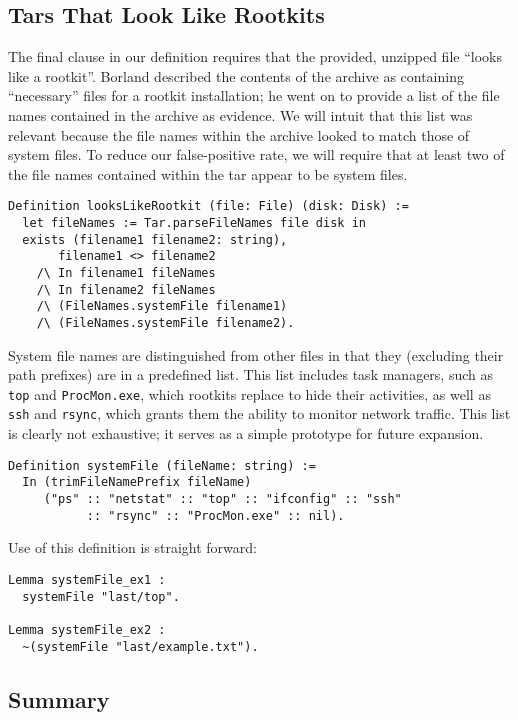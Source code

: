 \documentclass[nocopyrightspace,preprint]{sigplanconf}
\begin{document}
\subsection{Tars That Look Like Rootkits}

The final clause in our definition requires that the provided, unzipped file
``looks like a rootkit''. Borland described the contents of the archive as
containing ``necessary'' files for a rootkit installation; he went on to
provide a list of the file names contained in the archive as evidence. We will
intuit that this list was relevant because the file names within the archive
looked to match those of system files. To reduce our false-positive rate, we
will require that at least two of the file names contained within the tar
appear to be system files.

\begin{lstlisting}
Definition looksLikeRootkit (file: File) (disk: Disk) :=
  let fileNames := Tar.parseFileNames file disk in
  exists (filename1 filename2: string),
       filename1 <> filename2
    /\ In filename1 fileNames
    /\ In filename2 fileNames
    /\ (FileNames.systemFile filename1)
    /\ (FileNames.systemFile filename2).
\end{lstlisting}

System file names are distinguished from other files in that they (excluding
their path prefixes) are in a predefined list. This list includes task
managers, such as {\tt top} and {\tt ProcMon.exe}, which rootkits replace to
hide their activities, as well as {\tt ssh} and {\tt rsync}, which grants them
the ability to monitor network traffic. This list is clearly not exhaustive;
it serves as a simple prototype for future expansion.

\begin{lstlisting}
Definition systemFile (fileName: string) :=
  In (trimFileNamePrefix fileName)
     ("ps" :: "netstat" :: "top" :: "ifconfig" :: "ssh"
           :: "rsync" :: "ProcMon.exe" :: nil).
\end{lstlisting}

Use of this definition is straight forward:

\begin{lstlisting}
Lemma systemFile_ex1 : 
  systemFile "last/top".

Lemma systemFile_ex2 : 
  ~(systemFile "last/example.txt").
\end{lstlisting}

\subsection{Summary}
\end{document}

